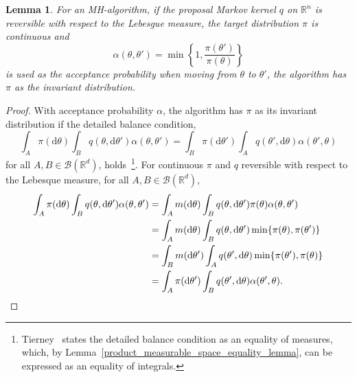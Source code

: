 \documentclass[english,twoside,openright]{HYgraduMLDS}
\newtheorem{lemma}{Lemma}[chapter]
\newcommand{\R}{\mathbb{R}}
\newcommand{\dx}{\mathrm{d}}
\begin{document}
\begin{lemma}\label{reversible_proposal_lemma}
  For an MH-algorithm,
  if the proposal Markov kernel \(q\) on \(\R^{n}\) is reversible with
  respect to the
  Lebesgue measure, the target distribution \(\pi\) is continuous and
  \[
    \alpha(\theta, \theta') = \min\left\{1, \frac{\pi(\theta')}{\pi(\theta)}\right\}
  \]
  is used as the acceptance probability when moving from \(\theta\) to \(\theta'\),
  the algorithm has \(\pi\) as the invariant distribution.
\end{lemma}
\begin{proof}
  With acceptance probability \(\alpha\), the algorithm has \(\pi\) as its
  invariant distribution if the detailed balance condition,
  \[
    \int_{A}\pi(\dx \theta)\int_{B}q(\theta, \dx \theta')\alpha(\theta, \theta')
    = \int_{B}\pi(\dx \theta')\int_{A}q(\theta', \dx \theta)\alpha(\theta', \theta)
  \]
  for all \(A, B\in \mathcal{B}(\R^{d})\), holds~\cite{Tie98}\footnote{
    Tierney~\cite{Tie98} states the detailed balance condition as an equality
    of measures, which, by Lemma~\ref{product_measurable_space_equality_lemma}, can be
    expressed as an equality of integrals.
  }.
  For continuous \(\pi\) and \(q\) reversible with respect to the Lebesque measure,
  for all \(A, B\in \mathcal{B}(\R^{d})\),
  \begin{align*}
    \int_{A}\pi(\dx \theta)\int_{B}q(\theta, \dx \theta')\alpha(\theta, \theta')
    &= \int_{A}m(\dx \theta)\int_{B}q(\theta, \dx \theta')\pi(\theta)\alpha(\theta, \theta')
    \\&= \int_{A}m(\dx\theta)\int_{B}q(\theta, \dx \theta')\min\{\pi(\theta), \pi(\theta')\}
    \\&= \int_{B}m(\dx\theta')\int_{A}q(\theta', \dx \theta)\min\{\pi(\theta'), \pi(\theta)\}
    \\&= \int_{A}\pi(\dx \theta')\int_{B}q(\theta', \dx \theta)\alpha(\theta', \theta).
    \qedhere
  \end{align*}
\end{proof}
\end{document}
